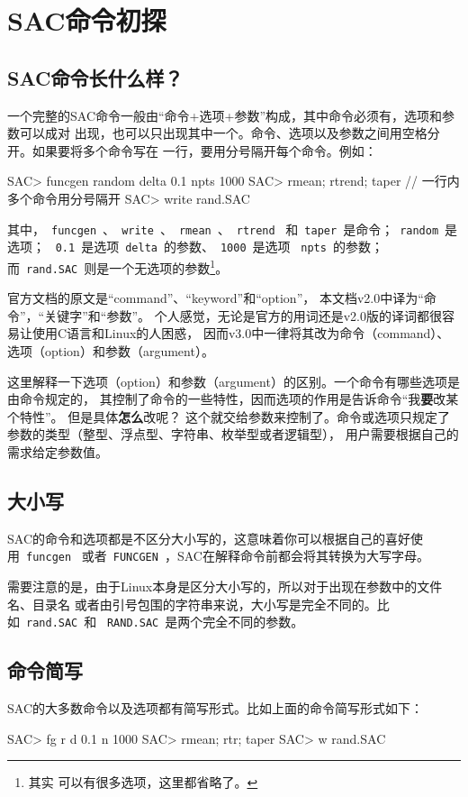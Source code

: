 \section{SAC命令初探}
\subsection{SAC命令长什么样？}
一个完整的SAC命令一般由``命令+选项+参数''构成，其中命令必须有，选项和参数可以成对
出现，也可以只出现其中一个。命令、选项以及参数之间用空格分开。如果要将多个命令写在
一行，要用分号隔开每个命令。例如：
\begin{SACCode}
SAC> funcgen random delta 0.1 npts 1000
SAC> rmean; rtrend; taper                 // 一行内多个命令用分号隔开
SAC> write rand.SAC
\end{SACCode}
其中，~\verb+funcgen+~、~\verb+write+~、~\verb+rmean+~、~\verb+rtrend+~
和~\verb+taper+~是命令；~\verb+random+~是选项；
~\verb+0.1+~是选项~\verb+delta+~的参数、~\verb+1000+~是选项
~\verb+npts+~的参数；而~\verb+rand.SAC+~则是一个无选项的参数\footnote{其实
可以有很多选项，这里都省略了。}。

\begin{Tips}
官方文档的原文是``command''、``keyword''和``option''，
本文档v2.0中译为``命令''，``关键字''和``参数''。
个人感觉，无论是官方的用词还是v2.0版的译词都很容易让使用C语言和Linux的人困惑，
因而v3.0中一律将其改为命令（command）、选项（option）和参数（argument）。

这里解释一下选项（option）和参数（argument）的区别。一个命令有哪些选项是由命令规定的，
其控制了命令的一些特性，因而选项的作用是告诉命令``我\textbf{要}改某个特性''。
但是具体\textbf{怎么}改呢？
这个就交给参数来控制了。命令或选项只规定了参数的类型（整型、浮点型、字符串、枚举型或者逻辑型），
用户需要根据自己的需求给定参数值。
\end{Tips}

\subsection{大小写}
SAC的命令和选项都是不区分大小写的，这意味着你可以根据自己的喜好使用~\verb+funcgen+~
或者~\verb+FUNCGEN+~，SAC在解释命令前都会将其转换为大写字母。

需要注意的是，由于Linux本身是区分大小写的，所以对于出现在参数中的文件名、目录名
或者由引号包围的字符串来说，大小写是完全不同的。比如~\verb+rand.SAC+~和
~\verb+RAND.SAC+~是两个完全不同的参数。

\subsection{命令简写}
SAC的大多数命令以及选项都有简写形式。比如上面的命令简写形式如下：
\begin{SACCode}
SAC> fg r d 0.1 n 1000
SAC> rmean; rtr; taper
SAC> w rand.SAC
\end{SACCode}

